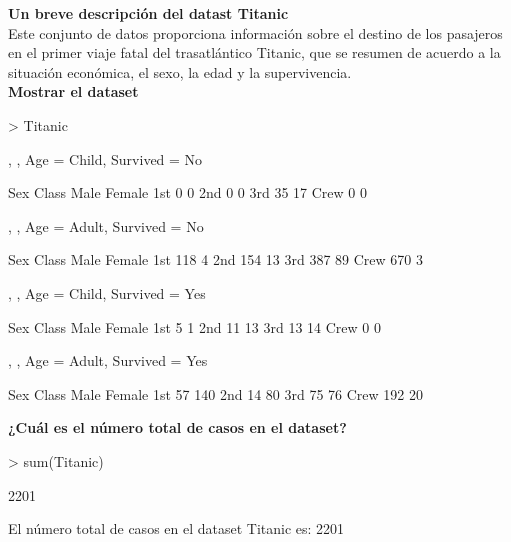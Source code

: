 \documentclass[6pt]{report}
\begin{document}
\textbf{Un breve descripción del datast Titanic}\\
Este conjunto de datos proporciona información sobre el destino de los pasajeros en el primer viaje fatal del trasatlántico Titanic, que se resumen de acuerdo a la situación económica, el sexo, la edad y la supervivencia.\\

\textbf{Mostrar el dataset}
\begin{Schunk}
\begin{Sinput}
> Titanic
\end{Sinput}
\begin{Soutput}
, , Age = Child, Survived = No

      Sex
Class  Male Female
  1st     0      0
  2nd     0      0
  3rd    35     17
  Crew    0      0

, , Age = Adult, Survived = No

      Sex
Class  Male Female
  1st   118      4
  2nd   154     13
  3rd   387     89
  Crew  670      3

, , Age = Child, Survived = Yes

      Sex
Class  Male Female
  1st     5      1
  2nd    11     13
  3rd    13     14
  Crew    0      0

, , Age = Adult, Survived = Yes

      Sex
Class  Male Female
  1st    57    140
  2nd    14     80
  3rd    75     76
  Crew  192     20
\end{Soutput}
\end{Schunk}

\textbf{¿Cuál es el número total de casos en el dataset?}
\begin{Schunk}
\begin{Sinput}
> sum(Titanic)
\end{Sinput}
\begin{Soutput}
[1] 2201
\end{Soutput}
\end{Schunk}
El número total de casos en el dataset Titanic es:  2201
\end{document}
